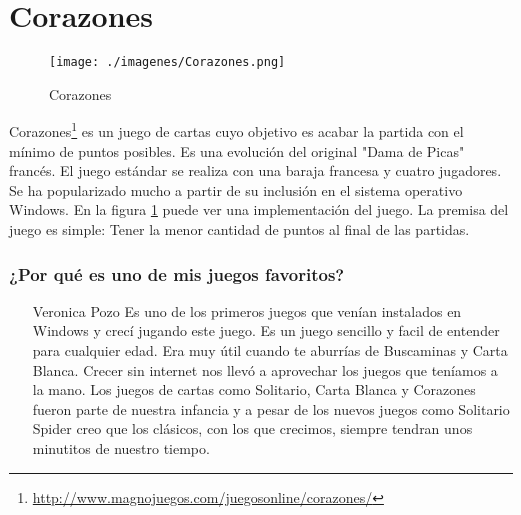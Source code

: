\section{Corazones}

\begin{figure}[htbp]
\begin{center}
\texttt{[image: ./imagenes/Corazones.png]}
\caption{Corazones}
\label{Corazones}
\end{center}
\end{figure}
Corazones\footnote{\url{http://www.magnojuegos.com/juegosonline/corazones/}} es un juego de cartas cuyo objetivo es acabar la partida con el mínimo de puntos posibles. Es una evolución del original "Dama de Picas" francés. El juego estándar se realiza con una baraja francesa y cuatro jugadores. Se ha popularizado mucho a partir de su inclusión en el sistema operativo Windows.
En la figura \ref{Corazones} puede ver una implementación del juego.
La premisa del juego es simple: Tener la menor cantidad de puntos al final de las partidas.

\subsubsection{¿Por qué es uno de mis juegos favoritos?}
\begin{itemize}
\item[Veronica Pozo] Es uno de los primeros juegos que venían instalados en Windows y crecí jugando este juego. Es un juego sencillo y facil de entender para cualquier edad. Era muy útil cuando te aburrías de Buscaminas y Carta Blanca. Crecer sin internet nos llevó a aprovechar los juegos que teníamos a la mano. Los juegos de cartas como Solitario, Carta Blanca y Corazones fueron parte de nuestra infancia y a pesar de los nuevos juegos como Solitario Spider creo que los clásicos, con los que crecimos, siempre tendran unos minutitos de nuestro tiempo.
\end{itemize}

